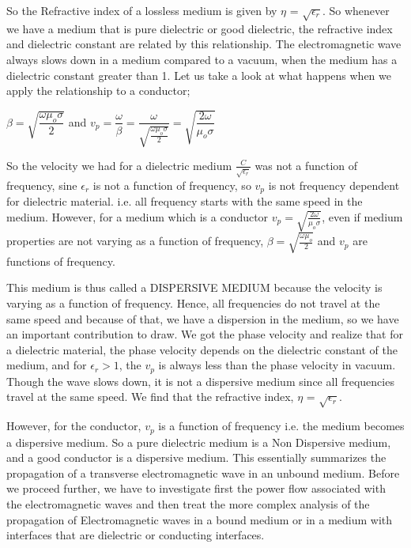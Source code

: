 So the Refractive index of a lossless medium is given by  $\eta$ = $\sqrt{\epsilon_{r}}$. So whenever we have a medium that is pure dielectric or good dielectric, the refractive index and dielectric constant are related by this relationship. The electromagnetic wave always slows down in a medium compared to a vacuum, when the medium has a dielectric constant greater than 1.
Let us take a look at what happens when we apply the relationship to a conductor;

$\beta=\sqrt{\dfrac{\omega\mu_{o}\sigma}{2}}$  and   $v_p=\dfrac{\omega}{\beta}=\dfrac{\omega}{\sqrt{\frac{\omega\mu_{o}\sigma}{2}}}=\sqrt{\dfrac{2\omega}{\mu_{o}\sigma}}$

So the velocity we had for a dielectric medium $\frac{C}{\sqrt{\epsilon_{r}}}$ was not a function of frequency, sine $\epsilon_{r}$ is not a function of frequency, so $v_p$ is not frequency dependent for dielectric material. i.e. all frequency starts with the same speed in the medium.
However, for a medium which is a conductor $v_p=\sqrt{\frac{2\omega}{\mu_{o}\sigma}}$, even if medium properties are not varying as a function of frequency, $\beta=\sqrt{\frac{\omega\mu_{o}}{2}}$ and $v_p$ are functions of frequency.

This medium is thus called a DISPERSIVE MEDIUM because the velocity is varying as a function of frequency. Hence, all frequencies do not travel at the same speed and because of that, we have a dispersion in the medium, so we have an important contribution to draw.
We got the phase velocity and realize that for a dielectric material, the phase velocity depends on the dielectric constant of the medium, and for $\epsilon_{r} > 1$, the $v_p$ is always less than the phase velocity in vacuum. Though the wave slows down, it is not a dispersive medium since all frequencies travel at the same speed. We find that the refractive index, $\eta$ = $\sqrt{\epsilon_{r}}$.

However, for the conductor, $v_p$ is a function of frequency i.e. the medium becomes a dispersive medium. So a pure dielectric medium is a Non Dispersive medium, and a good conductor is a dispersive medium. This essentially summarizes the propagation of a transverse electromagnetic wave in an unbound medium. Before we proceed further, we have to investigate first the power flow associated with the electromagnetic waves and then treat the more complex analysis of the propagation of Electromagnetic waves in a bound medium or in a medium with interfaces that are dielectric or conducting interfaces.

